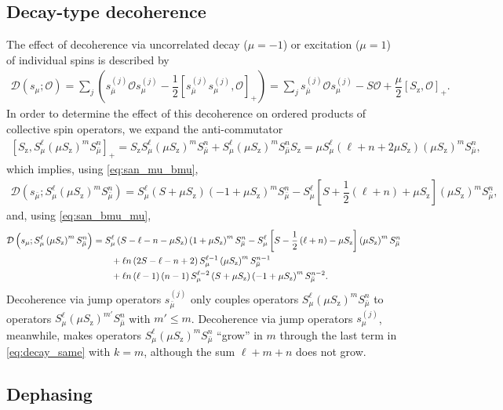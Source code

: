\documentclass[aps,11pt,notitlepage,nofootinbib,longbibliography]{revtex4-1}
\newcommand{\f}[2]{\dfrac{#1}{#2}} %
\newcommand{\p}[1]{\left(#1\right)} %
\renewcommand{\sp}[1]{\left[#1\right]} %
\newcommand{\D}{\mathcal{D}}
\renewcommand{\O}{\mathcal{O}}
\newcommand{\z}{\text{z}}
\newcommand{\bmu}{{\bar\mu}}
\newcommand{\1}{\mathds{1}}
\begin{document}
\subsection{Decay-type decoherence}
\label{sec:decay_single}

The effect of decoherence via uncorrelated decay ($\mu=-1$) or
excitation ($\mu=1$) of individual spins is described by
\begin{align}
  \D\p{s_\mu; \O}
  = \sum_j\p{s_\bmu^{(j)} \O s_\mu^{(j)}
    - \f12\sp{s_\bmu^{(j)} s_\mu^{(j)},\O}_+}
  = \sum_j s_\bmu^{(j)} \O s_\mu^{(j)}
  - S \O + \f{\mu}{2} \sp{S_\z, \O}_+.
\end{align}
In order to determine the effect of this decoherence on ordered
products of collective spin operators, we expand the anti-commutator
\begin{align}
  \sp{S_\z, S_\mu^\ell \p{\mu S_\z}^m S_\bmu^n}_+
  = S_\z S_\mu^\ell \p{\mu S_\z}^m S_\bmu^n
  + S_\mu^\ell \p{\mu S_\z}^m S_\bmu^n S_\z
  = \mu S_\mu^\ell\p{\ell+n+2\mu S_\z} \p{\mu S_\z}^m S_\bmu^n,
\end{align}
which implies, using \eqref{eq:san_mu_bmu},
\begin{align}
  \D\p{s_\bmu; S_\mu^\ell \p{\mu S_\z}^m S_\bmu^n}
  = S_\mu^\ell \p{S+\mu S_\z}\p{-1+\mu S_\z}^m S_\bmu^n
  - S_\mu^\ell\sp{S + \f12\p{\ell+n} + \mu S_\z}
  \p{\mu S_\z}^m S_\bmu^n,
  \label{eq:decay_diff}
\end{align}
and, using \eqref{eq:san_bmu_mu},
\begin{align}
  \D\p{s_\mu; S_\mu^\ell \p{\mu S_\z}^m S_\bmu^n}
  &= S_\mu^\ell \p{S - \ell - n - \mu S_\z} \p{1+\mu S_\z}^m S_\bmu^n
  - S_\mu^\ell\sp{S - \f12\p{\ell+n} - \mu S_\z}
  \p{\mu S_\z}^m S_\bmu^n \notag \\
  &\qquad + \ell n \p{2S - \ell - n + 2}
  S_\mu^{\ell-1} \p{\mu S_\z}^m S_\bmu^{n-1} \notag \\
  &\qquad + \ell n \p{\ell-1} \p{n-1} S_\mu^{\ell-2} \p{S + \mu S_\z}
  \p{-1+\mu S_\z}^m S_\bmu^{n-2}.
  \label{eq:decay_same}
\end{align}
Decoherence via jump operators $s_\bmu^{(j)}$ only couples operators
$S_\mu^\ell \p{\mu S_\z}^m S_\bmu^n$ to operators
$S_\mu^\ell \p{\mu S_\z}^{m'} S_\bmu^n$ with $m'\le m$.  Decoherence
via jump operators $s_\mu^{(j)}$, meanwhile, makes operators
$S_\mu^\ell \p{\mu S_\z}^m S_\bmu^n$ ``grow'' in $m$ through the last
term in \eqref{eq:decay_same} with $k=m$, although the sum $\ell+m+n$
does not grow.


\subsection{Dephasing}
\label{sec:dephasing_single}
\end{document}
